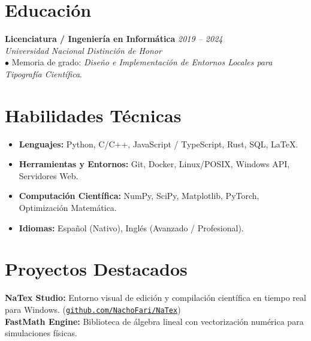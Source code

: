 \documentclass[10pt, letterpaper]{article}
\begin{document}
\section{Educación}

\textbf{Licenciatura / Ingeniería en Informática} \hfill \textit{2019 -- 2024} \\
\textit{Universidad Nacional} \hfill \textit{Distinción de Honor} \\
$\bullet$ Memoria de grado: \textit{Diseño e Implementación de Entornos Locales para Tipografía Científica}.

\section{Habilidades Técnicas}

\begin{itemize}
  \item \textbf{Lenguajes:} Python, C/C++, JavaScript / TypeScript, Rust, SQL, LaTeX.
  \item \textbf{Herramientas y Entornos:} Git, Docker, Linux/POSIX, Windows API, Servidores Web.
  \item \textbf{Computación Científica:} NumPy, SciPy, Matplotlib, PyTorch, Optimización Matemática.
  \item \textbf{Idiomas:} Español (Nativo), Inglés (Avanzado / Profesional).
\end{itemize}

\section{Proyectos Destacados}

\textbf{NaTex Studio:} Entorno visual de edición y compilación científica en tiempo real para Windows. (\href{https://github.com/NachoFari/NaTex}{\texttt{github.com/NachoFari/NaTex}}) \\
\textbf{FastMath Engine:} Biblioteca de álgebra lineal con vectorización numérica para simulaciones físicas.
\end{document}
